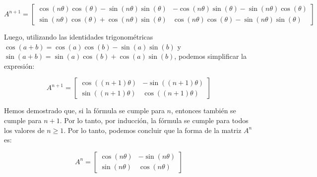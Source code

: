 $$A^{n+1} = \begin{bmatrix}\cos(n\theta)\cos(\theta) - \sin(n\theta)\sin(\theta) & -\cos(n\theta)\sin(\theta) - \sin(n\theta)\cos(\theta) \\ \sin(n\theta)\cos(\theta) + \cos(n\theta)\sin(\theta) & \cos(n\theta)\cos(\theta) - \sin(n\theta)\sin(\theta)\end{bmatrix}$$

Luego, utilizando las identidades trigonométricas $\cos(a+b) = \cos(a)\cos(b) - \sin(a)\sin(b)$ y $\sin(a+b) = \sin(a)\cos(b) + \cos(a)\sin(b)$, podemos simplificar la expresión:

$$A^{n+1} = \begin{bmatrix}\cos((n+1)\theta) & -\sin((n+1)\theta) \\ \sin((n+1)\theta) & \cos((n+1)\theta)\end{bmatrix}$$

Hemos demostrado que, si la fórmula se cumple para $n$, entonces también se cumple para $n+1$. Por lo tanto, por inducción, la fórmula se cumple para todos los valores de $n \geq 1$. Por lo tanto, podemos concluir que la forma de la matriz $A^n$ es:

$$A^n = \begin{bmatrix}\cos(n\theta) & -\sin(n\theta) \\ \sin(n\theta) & \cos(n\theta)\end{bmatrix}$$
